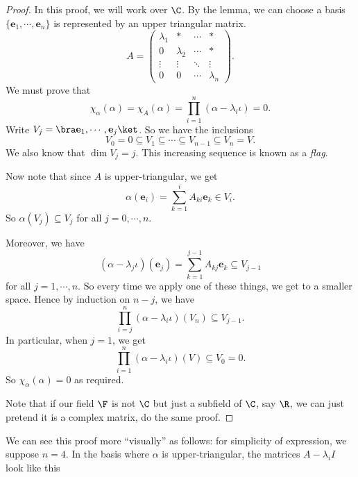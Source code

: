 \documentclass[a4paper]{article}
\begin{document}
\begin{proof}
  In this proof, we will work over $\C$. By the lemma, we can choose a basis $\{\mathbf{e}_1, \cdots, \mathbf{e}_n\}$ is represented by an upper triangular matrix.
  \[
    A =
    \begin{pmatrix}
      \lambda_1 & * & \cdots & *\\
      0 & \lambda_2 & \cdots & *\\
      \vdots & \vdots & \ddots & \vdots\\
      0 & 0 & \cdots & \lambda_n
    \end{pmatrix}.
  \]
  We must prove that
  \[
    \chi_\alpha(\alpha) = \chi_A(\alpha) = \prod_{i = 1}^n (\alpha - \lambda_i \iota) = 0.
  \]
  Write $V_j = \bra \mathbf{e}_1, \cdots, \mathbf{e}_j\ket$. So we have the inclusions
  \[
    V_0 = 0 \subseteq V_1 \subseteq \cdots \subseteq V_{n - 1} \subseteq V_n = V.
  \]
  We also know that $\dim V_j = j$. This increasing sequence is known as a \emph{flag}.

  Now note that since $A$ is upper-triangular, we get
  \[
    \alpha(\mathbf{e}_i) = \sum_{k = 1}^i A_{ki} \mathbf{e}_k \in V_i.
  \]
  So $\alpha (V_j)\subseteq V_j$ for all $j = 0, \cdots, n$.

  Moreover, we have
  \[
    (\alpha - \lambda_j\iota)(\mathbf{e}_j) = \sum_{k = 1}^{j - 1} A_{kj}\mathbf{e}_k \subseteq V_{j - 1}
  \]
  for all $j = 1, \cdots, n$. So every time we apply one of these things, we get to a smaller space. Hence by induction on $n - j$, we have
  \[
    \prod_{i = j}^n (\alpha - \lambda_i \iota) (V_n) \subseteq V_{j - 1}.
  \]
  In particular, when $j = 1$, we get
  \[
    \prod_{i = 1}^n (\alpha - \lambda_i \iota) (V) \subseteq V_0 = 0.
  \]
  So $\chi_\alpha(\alpha) = 0$ as required.

  Note that if our field $\F$ is not $\C$ but just a subfield of $\C$, say $\R$, we can just pretend it is a complex matrix, do the same proof.
\end{proof}
We can see this proof more ``visually'' as follows: for simplicity of expression, we suppose $n = 4$. In the basis where $\alpha$ is upper-triangular, the matrices $A - \lambda_i I$ look like this
\end{document}
